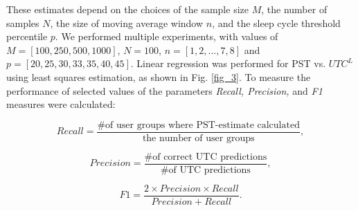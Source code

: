 These estimates depend on the 
 choices of the sample size $M$, the number of samples $N$, the size of moving average window $n$, and the sleep cycle threshold percentile $p$. %
We performed multiple experiments, with values of $M=[100, 250, 500, 1000]$, $N=100$, $n = [1, 2, ..., 7, 8]$ and $p = [20, 25, 30, 33, 35, 40, 45]$. %
Linear regression was performed for PST vs. $UTC^L$ using least squares estimation, %
as shown in Fig. \ref{fig_3}. To measure the performance of selected values of the parameters \emph{Recall, Precision,} and \emph{F1} measures were calculated: 

$${Recall} = \frac{\mbox{\# of user groups where PST-estimate calculated}}{ \mbox{the number of user groups}},$$

$${Precision} = \frac{\mbox{\# of correct UTC predictions}}{\mbox {\# of UTC predictions}},$$

$$F1=\frac{2 \times {Precision}\times {Recall}} {{Precision + Recall}}.$$ 


